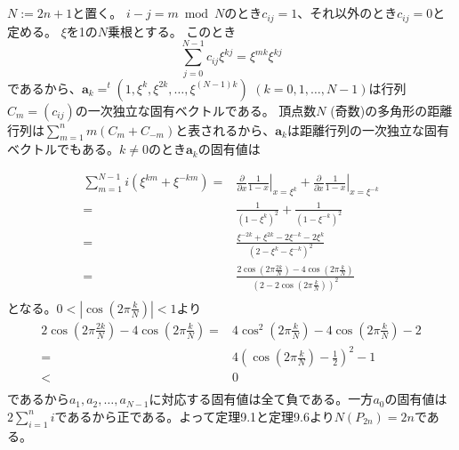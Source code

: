 \subsection{}
$N:=2n+1$と置く。
$i-j=m\bmod N$のとき$c_{ij}=1
$、それ以外のとき$c_{ij}=0$と定める。
$\xi$を1の$N$乗根とする。
このとき
$$\sum_{j=0}^{N-1} c_{ij}\xi^{kj} = \xi^{mk} \xi^{kj}$$
であるから、$\bm{a}_k=^t(1,\xi^k,\xi^{2k},\ldots,\xi^{(N-1)k})$ $(k=0,1,\ldots,N-1)$は行列$C_m=(c_{ij})$の一次独立な固有ベクトルである。
頂点数$N$ (奇数)の多角形の距離行列は$\sum_{m=1}^n m(C_m+C_{-m})$と表されるから、$\bm{a}_k$は距離行列の一次独立な固有ベクトルでもある。$k\neq 0$のとき$\bm{a}_k$の固有値は

\begin{align*}
  \sum_{m=1}^{N-1} i(\xi^{km}+\xi^{-km})
  =& \left.\frac{\partial}{\partial x} \frac{1}{1-x}\right|_{x=\xi^k}+\left.\frac{\partial}{\partial x} \frac{1}{1-x}\right|_{x=\xi^{-k}}\\
  =& \frac{1}{(1-\xi^k)^2}+\frac{1}{(1-\xi^{-k})^2}\\
  =& \frac{\xi^{-2k}+\xi^{2k}-2\xi^{-k}-2\xi^{k}}{(2-\xi^k-\xi^{-k})^2}\\
  =& \frac{2\cos\left(2\pi \frac{2k}{N}\right)-4\cos\left(2\pi \frac{k}{N}\right)}{\left(2-2\cos\left(2\pi \frac{k}{N}\right)\right)^2}\\
\end{align*}
となる。$0<|\cos\left(2\pi \frac{k}{N}\right)|<1$より
\begin{align*}
  2\cos\left(2\pi \frac{2k}{N}\right)-4\cos\left(2\pi \frac{k}{N}\right)
  =&4\cos^2\left(2\pi \frac{k}{N}\right)-4\cos\left(2\pi \frac{k}{N}\right)-2\\
  =&4\left(\cos\left(2\pi \frac{k}{N}\right)-\frac{1}{2}\right)^2-1\\
  < &0\\
\end{align*}
であるから$a_{1},a_{2},\ldots,a_{N-1}$に対応する固有値は全て負である。一方$a_0$の固有値は$2\sum_{i=1}^n i$であるから正である。よって定理9.1と定理9.6より$N(P_{2n})=2n$である。
